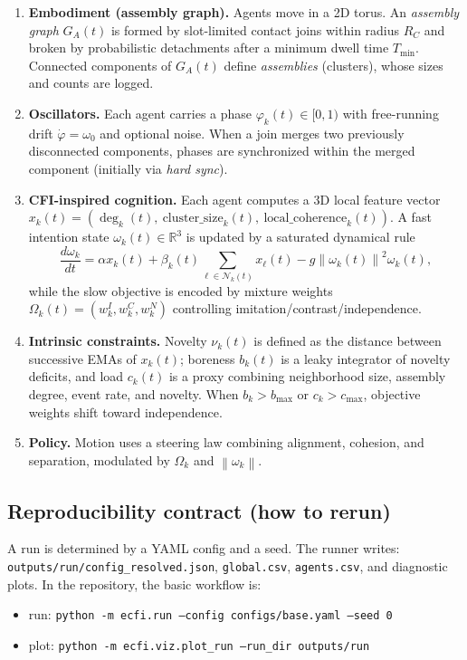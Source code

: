\documentclass[11pt]{article}
\newcommand{\R}{\mathbb{R}}
\newcommand{\Neigh}{\mathcal{N}} %
\newcommand{\nov}{\nu}          %
\newcommand{\varph}{\varphi}    %
\newcommand{\norm}[1]{\left\lVert #1 \right\rVert}
\begin{document}
\begin{enumerate}[leftmargin=2.2em]
\item \textbf{Embodiment (assembly graph).} Agents move in a 2D torus. An \emph{assembly graph} $G_A(t)$ is formed by slot-limited contact joins
within radius $R_C$ and broken by probabilistic detachments after a minimum dwell time $T_{\min}$.
Connected components of $G_A(t)$ define \emph{assemblies} (clusters), whose sizes and counts are logged.
\item \textbf{Oscillators.} Each agent carries a phase $\varph_k(t)\in[0,1)$ with free-running drift $\dot{\varph}=\omega_0$ and optional noise.
When a join merges two previously disconnected components, phases are synchronized within the merged component (initially via \emph{hard sync}).
\item \textbf{CFI-inspired cognition.} Each agent computes a 3D local feature vector
$x_k(t)=(\deg_k(t),\ \text{cluster\_size}_k(t),\ \text{local\_coherence}_k(t))$.
A fast intention state $\omega_k(t)\in\R^3$ is updated by a saturated dynamical rule
\[
\frac{d\omega_k}{dt}=\alpha x_k(t) + \beta_k(t)\sum_{\ell\in\Neigh_k(t)}x_\ell(t) - g\norm{\omega_k(t)}^2\omega_k(t),
\]
while the slow objective is encoded by mixture weights $\Omega_k(t)=(w^I_k,w^C_k,w^N_k)$ controlling imitation/contrast/independence.
\item \textbf{Intrinsic constraints.} Novelty $\nov_k(t)$ is defined as the distance between successive EMAs of $x_k(t)$;
boreness $b_k(t)$ is a leaky integrator of novelty deficits, and load $c_k(t)$ is a proxy combining neighborhood size, assembly degree,
event rate, and novelty.
When $b_k>b_{\max}$ or $c_k>c_{\max}$, objective weights shift toward independence.
\item \textbf{Policy.} Motion uses a steering law combining alignment, cohesion, and separation, modulated by $\Omega_k$ and $\norm{\omega_k}$.
\end{enumerate}

\subsection{Reproducibility contract (how to rerun)}
A run is determined by a YAML config and a seed. The runner writes:
\texttt{outputs/run/config\_resolved.json}, \texttt{global.csv}, \texttt{agents.csv}, and diagnostic plots.
In the repository, the basic workflow is:

\begin{itemize}[leftmargin=2.2em]
\item run: \texttt{python -m ecfi.run --config configs/base.yaml --seed 0}
\item plot: \texttt{python -m ecfi.viz.plot\_run --run\_dir outputs/run}
\end{itemize}
\end{document}
